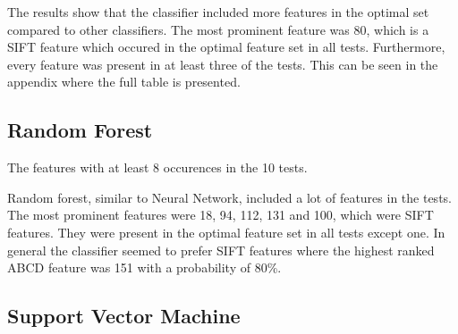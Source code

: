 \documentclass{kththesis}
\begin{document}
The results show that the classifier included more features in the optimal set compared to other classifiers. The most prominent feature was 80, which is a SIFT feature which occured in the optimal feature set in all tests. Furthermore, every feature was present in at least three of the tests. This can be seen in the appendix where the full table is presented.

\subsection{Random Forest}

\begin{table}[h!]
  \begin{center}
    \caption{The features with at least 8 occurences in the 10 tests.}
  \end{center}
\end{table}

Random forest, similar to Neural Network, included a lot of features in the tests. The most prominent features were 18, 94, 112, 131 and 100, which were SIFT features. They were present in the optimal feature set in all tests except one. In general the classifier seemed to prefer SIFT features where the highest ranked ABCD feature was 151 with a probability of 80\%.

\subsection{Support Vector Machine}
\end{document}
